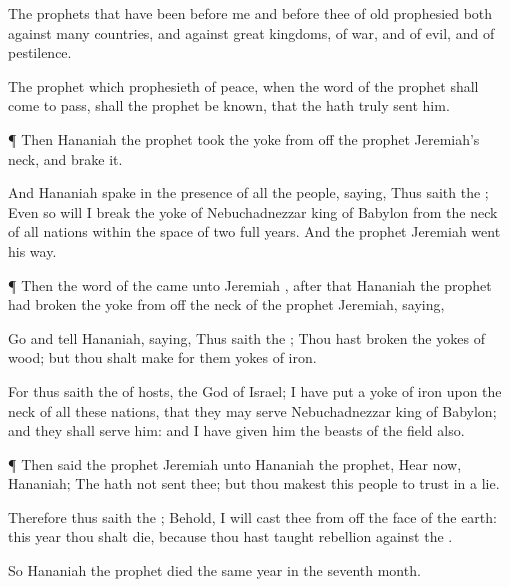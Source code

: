 {The
prophets that have been
before me and
before thee of
old
prophesied both against
many
countries, and against
great
kingdoms, of
war, and of
evil, and of
pestilence.

The
prophet which
prophesieth of
peace, when the
word of the
prophet shall come to
pass,
{} shall the
prophet be
known, that the
{} hath
truly
sent him.


\par }{\PP {}¶ Then
Hananiah the
prophet
took the
yoke from off the
prophet
Jeremiah’s
neck, and
brake it.

And
Hananiah
spake in the
presence of all the
people,
saying, Thus
saith the
{}; Even so will I
break the
yoke of
Nebuchadnezzar
king of
Babylon from the
neck of all
nations within the space of two
full
years. And the
prophet
Jeremiah
went his
way.


\par }{\PP {}¶ Then the
word of the
{} came unto
Jeremiah
{},
after that
Hananiah the
prophet had
broken the
yoke from off the
neck of the
prophet
Jeremiah,
saying,

Go and
tell
Hananiah,
saying, Thus
saith the
{}; Thou hast
broken the
yokes of
wood; but thou shalt
make for them
yokes of
iron.

For thus
saith the
{} of
hosts, the
God of
Israel; I have
put a
yoke of
iron upon the
neck of all these
nations, that they may
serve
Nebuchadnezzar
king of
Babylon; and they shall
serve him: and I have
given him the
beasts of the
field also.


\par }{\PP {}¶ Then
said the
prophet
Jeremiah unto
Hananiah the
prophet,
Hear now,
Hananiah; The
{} hath not
sent thee; but thou makest this
people to
trust in a
lie.

Therefore thus
saith the
{}; Behold, I will
cast thee from off the
face of the
earth: this
year thou shalt
die, because thou hast
taught
rebellion against the
{}.

So
Hananiah the
prophet
died the same
year in the
seventh
month.




\par }
